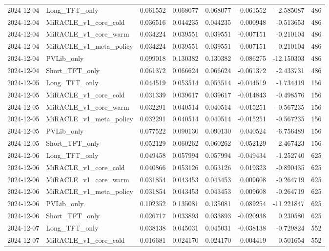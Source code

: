 \begin{tabular}{llrrrrrr}
2024-12-04 & Long_TFT_only & 0.061552 & 0.068077 & 0.068077 & -0.061552 & -2.585087 & 486 \\
2024-12-04 & MiRACLE_v1_core_cold & 0.036516 & 0.044235 & 0.044235 & 0.000948 & -0.513653 & 486 \\
2024-12-04 & MiRACLE_v1_core_warm & 0.034224 & 0.039551 & 0.039551 & -0.007151 & -0.210104 & 486 \\
2024-12-04 & MiRACLE_v1_meta_policy & 0.034224 & 0.039551 & 0.039551 & -0.007151 & -0.210104 & 486 \\
2024-12-04 & PVLib_only & 0.099018 & 0.130382 & 0.130382 & 0.086275 & -12.150303 & 486 \\
2024-12-04 & Short_TFT_only & 0.061372 & 0.066624 & 0.066624 & -0.061372 & -2.433731 & 486 \\
2024-12-05 & Long_TFT_only & 0.044519 & 0.053514 & 0.053514 & -0.044519 & -1.734419 & 156 \\
2024-12-05 & MiRACLE_v1_core_cold & 0.031339 & 0.039617 & 0.039617 & -0.014843 & -0.498576 & 156 \\
2024-12-05 & MiRACLE_v1_core_warm & 0.032291 & 0.040514 & 0.040514 & -0.015251 & -0.567235 & 156 \\
2024-12-05 & MiRACLE_v1_meta_policy & 0.032291 & 0.040514 & 0.040514 & -0.015251 & -0.567235 & 156 \\
2024-12-05 & PVLib_only & 0.077522 & 0.090130 & 0.090130 & 0.040524 & -6.756489 & 156 \\
2024-12-05 & Short_TFT_only & 0.052129 & 0.060262 & 0.060262 & -0.052129 & -2.467423 & 156 \\
2024-12-06 & Long_TFT_only & 0.049458 & 0.057994 & 0.057994 & -0.049434 & -1.252740 & 625 \\
2024-12-06 & MiRACLE_v1_core_cold & 0.040866 & 0.053126 & 0.053126 & 0.019323 & -0.890435 & 625 \\
2024-12-06 & MiRACLE_v1_core_warm & 0.031854 & 0.043453 & 0.043453 & 0.009608 & -0.264719 & 625 \\
2024-12-06 & MiRACLE_v1_meta_policy & 0.031854 & 0.043453 & 0.043453 & 0.009608 & -0.264719 & 625 \\
2024-12-06 & PVLib_only & 0.102352 & 0.135081 & 0.135081 & 0.089254 & -11.221847 & 625 \\
2024-12-06 & Short_TFT_only & 0.026717 & 0.033893 & 0.033893 & -0.020938 & 0.230580 & 625 \\
2024-12-07 & Long_TFT_only & 0.038138 & 0.045031 & 0.045031 & -0.038138 & -0.729824 & 552 \\
2024-12-07 & MiRACLE_v1_core_cold & 0.016681 & 0.024170 & 0.024170 & 0.004419 & 0.501654 & 552 \\

\end{tabular}
